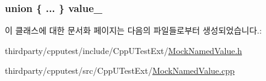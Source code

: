 \subsubsection[{\texorpdfstring{value\+\_\+}{value_}}]{\setlength{\rightskip}{0pt plus 5cm}union \{ ... \}   value\+\_\+\hspace{0.3cm}{\ttfamily [private]}}\hypertarget{class_mock_named_value_a68986aee29946116b59c6189c19733ac}{}\label{class_mock_named_value_a68986aee29946116b59c6189c19733ac}


이 클래스에 대한 문서화 페이지는 다음의 파일들로부터 생성되었습니다.\+:\begin{DoxyCompactItemize}
\item 
thirdparty/cpputest/include/\+Cpp\+U\+Test\+Ext/\hyperlink{_mock_named_value_8h}{Mock\+Named\+Value.\+h}\item 
thirdparty/cpputest/src/\+Cpp\+U\+Test\+Ext/\hyperlink{_mock_named_value_8cpp}{Mock\+Named\+Value.\+cpp}\end{DoxyCompactItemize}
